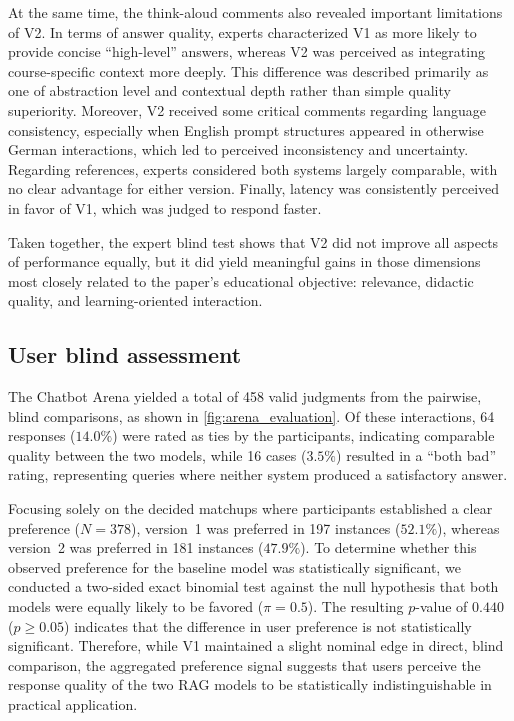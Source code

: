 At the same time, the think-aloud comments also revealed important limitations of V2. In terms of answer quality, experts characterized V1 as more likely to provide concise \enquote{high-level} answers, whereas V2 was perceived as integrating course-specific context more deeply. This difference was described primarily as one of abstraction level and contextual depth rather than simple quality superiority. Moreover, V2 received some critical comments regarding language consistency, especially when English prompt structures appeared in otherwise German interactions, which led to perceived inconsistency and uncertainty. Regarding references, experts considered both systems largely comparable, with no clear advantage for either version. Finally, latency was consistently perceived in favor of V1, which was judged to respond faster.

Taken together, the expert blind test shows that V2 did not improve all aspects of performance equally, but it did yield meaningful gains in those dimensions most closely related to the paper’s educational objective: relevance, didactic quality, and learning-oriented interaction. 

\subsection{User blind assessment}

The Chatbot Arena yielded a total of 458 valid judgments from the pairwise, blind comparisons, as shown in \autoref{fig:arena_evaluation}.
Of these interactions, 64 responses ($14.0\%$) were rated as ties by the participants, indicating comparable quality between the two models, while 16 cases ($3.5\%$) resulted in a \enquote{both bad} rating, representing queries where neither system produced a satisfactory answer.

Focusing solely on the decided matchups where participants established a clear preference ($N=378$), version~1 was preferred in 197 instances ($52.1\%$), whereas version~2 was preferred in 181 instances ($47.9\%$).
To determine whether this observed preference for the baseline model was statistically significant, we conducted a two-sided exact binomial test against the null hypothesis that both models were equally likely to be favored ($\pi=0.5$).
The resulting $p$-value of $0.440$ ($p \geq 0.05$) indicates that the difference in user preference is not statistically significant.
Therefore, while V1 maintained a slight nominal edge in direct, blind comparison, the aggregated preference signal suggests that users perceive the response quality of the two RAG models to be statistically indistinguishable in practical application.

